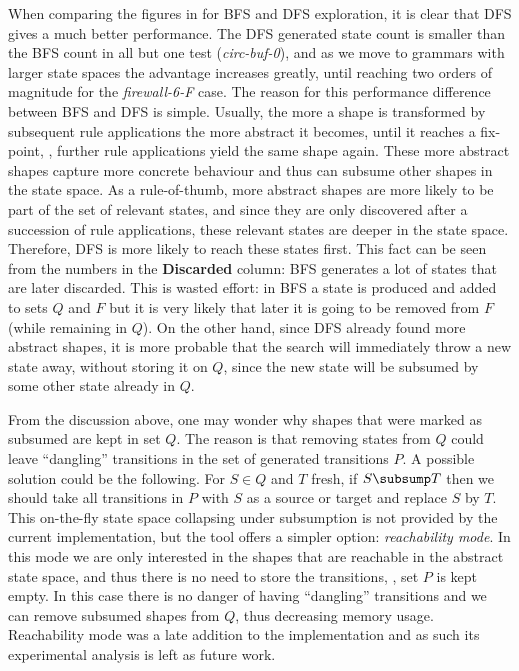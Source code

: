 When comparing the figures in  for BFS and DFS exploration, it is
clear that DFS gives a much better performance. The DFS generated state count is
smaller than the BFS count in all but one test (\emph{circ-buf-0}), and as we
move to grammars with larger state spaces the advantage increases greatly, until
reaching two orders of magnitude for the \emph{firewall-6-F} case. The reason
for this performance difference between BFS and DFS is simple. Usually, the more
a shape is transformed by subsequent rule applications the more abstract it
becomes, until it reaches a fix-point, \ie, further rule applications yield the
same shape again. These more abstract shapes capture more concrete behaviour
and thus can subsume other shapes in the state space. As a rule-of-thumb, more
abstract shapes are more likely to be part of the set of relevant states, and
since they are only discovered after a succession of rule applications, these
relevant states are deeper in the state space. Therefore, DFS is more likely to
reach these states first. This fact can be seen from the numbers in the {\bf
Discarded} column: BFS generates a lot of states that are later discarded. This
is wasted effort: in BFS a state is produced and added to sets $Q$ and $F$ but
it is very likely that later it is going to be removed from $F$ (while remaining
in $Q$). On the other hand, since DFS already found more abstract shapes, it is
more probable that the search will immediately throw a new state away, without
storing it on $Q$, since the new state will be subsumed by some other state
already in $Q$.

From the discussion above, one may wonder why shapes that were marked as
subsumed are kept in set $Q$. The reason is that removing states from $Q$ could
leave ``dangling'' transitions in the set of generated transitions $P$. A
possible solution could be the following. For $S \in Q$ and $T$ fresh, if $S
\subsump T$ then we should take all transitions in $P$ with $S$ as a source or
target and replace $S$ by $T$. This on-the-fly state space collapsing under
subsumption is not provided by the current implementation, but the tool offers
a simpler option: \emph{reachability mode}. In this mode we are only interested
in the shapes that are reachable in the abstract state space, and thus there is
no need to store the transitions, \ie, set $P$ is kept empty. In this case there
is no danger of having ``dangling'' transitions and we can remove subsumed
shapes from $Q$, thus decreasing memory usage. Reachability mode was a late
addition to the implementation and as such its experimental analysis is left as
future work.

